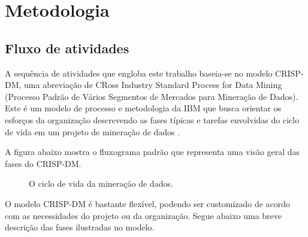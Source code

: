 \chapter{Metodologia}

\section{Fluxo de atividades}

A sequência de atividades que engloba este trabalho baseia-se no modelo CRISP-DM, uma abreviação de CRoss Industry Standard Process for Data Mining (Processo Padrão de Vários Segmentos de Mercados para Mineração de Dados). Este é um modelo de processo e metodologia da IBM que busca orientar os esforços da organização descrevendo as fases típicas e tarefas envolvidas do ciclo de vida em um projeto de mineração de dados \cite{crispdm}. 

A figura abaixo mostra o fluxograma padrão que representa uma visão geral das fases do CRISP-DM.

\begin{figure}[!htb]
    \caption{\label{fig:jupyter} O ciclo de vida da mineração de dados.}
\end{figure}

O modelo CRISP-DM é bastante flexível, podendo ser customizado de acordo com as necessidades do projeto ou da organização. Segue abaixo uma breve descrição das fases ilustradas no modelo.

